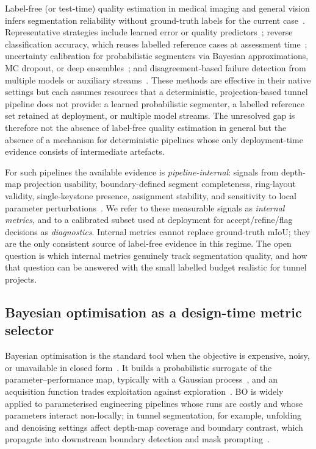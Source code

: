 \documentclass[a4paper,fleqn]{cas-dc}
\begin{document}
Label-free (or test-time) quality estimation in medical imaging and general vision infers segmentation reliability without ground-truth labels for the current case~\cite{kohlberger2012segmentationError,valindria2017rca}. Representative strategies include learned error or quality predictors~\cite{robinson2018segmentationQuality,fournel2021segmentationQC,zaman2023erroneousSurfaceRegions}; reverse classification accuracy, which reuses labelled reference cases at assessment time~\cite{valindria2017rca,cosarinsky2025inContextRCA}; uncertainty calibration for probabilistic segmenters via Bayesian approximations, MC dropout, or deep ensembles~\cite{guo2017calibration,gal2016dropout,kendall2017uncertainties,lakshminarayanan2017deepEnsembles}; and disagreement-based failure detection from multiple models or auxiliary streams~\cite{bogdoll2025lidarFailureDetection}. These methods are effective in their native settings but each assumes resources that a deterministic, projection-based tunnel pipeline does not provide: a learned probabilistic segmenter, a labelled reference set retained at deployment, or multiple model streams. The unresolved gap is therefore not the absence of label-free quality estimation in general but the absence of a mechanism for deterministic pipelines whose only deployment-time evidence consists of intermediate artefacts.

For such pipelines the available evidence is \emph{pipeline-internal}: signals from depth-map projection usability, boundary-defined segment completeness, ring-layout validity, single-keystone presence, assignment stability, and sensitivity to local parameter perturbations~\cite{sjolander2023automatedTunnelInspections,huang2021bimMlUnderground}. We refer to these measurable signals as \emph{internal metrics}, and to a calibrated subset used at deployment for accept/refine/flag decisions as \emph{diagnostics}. Internal metrics cannot replace ground-truth mIoU; they are the only consistent source of label-free evidence in this regime. The open question is which internal metrics genuinely track segmentation quality, and how that question can be answered with the small labelled budget realistic for tunnel projects.

\subsection{Bayesian optimisation as a design-time metric selector}

Bayesian optimisation is the standard tool when the objective is expensive, noisy, or unavailable in closed form~\cite{mockus1978bayesian,jones1998ego}. It builds a probabilistic surrogate of the parameter--performance map, typically with a Gaussian process~\cite{rasmussen2006gpml}, and an acquisition function trades exploitation against exploration~\cite{shahriari2016reviewBO}. BO is widely applied to parameterised engineering pipelines whose runs are costly and whose parameters interact non-locally; in tunnel segmentation, for example, unfolding and denoising settings affect depth-map coverage and boundary contrast, which propagate into downstream boundary detection and mask prompting~\cite{ye2025sam4tun}.
\end{document}
